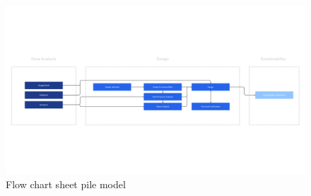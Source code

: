 \begin{landscape}
\begin{figure}[H]
    \centering
    \includegraphics[width=\linewidth]{figures/ch3/FlowChart Structural (3).png}
    \caption{Flow chart sheet pile model}
    \label{fig:flow_chart}
\end{figure}
\end{landscape}